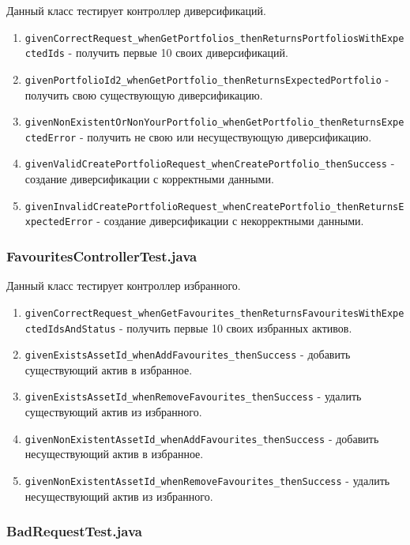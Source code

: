 \documentclass[a4paper, 14pt]{article}
\begin{document}
Данный класс тестирует контроллер диверсификаций.

\begin{enumerate}
    \item \texttt{givenCorrectRequest\_whenGetPortfolios\_thenReturnsPortfoliosWithExpectedIds} - получить первые 10 своих диверсификаций.
    \item \texttt{givenPortfolioId2\_whenGetPortfolio\_thenReturnsExpectedPortfolio} - получить свою существующую диверсификацию.
    \item \texttt{givenNonExistentOrNonYourPortfolio\_whenGetPortfolio\_thenReturnsExpectedError} - получить не свою или несуществующую диверсификацию.
    \item \texttt{givenValidCreatePortfolioRequest\_whenCreatePortfolio\_thenSuccess} - создание диверсификации с корректными данными.
    \item \texttt{givenInvalidCreatePortfolioRequest\_whenCreatePortfolio\_thenReturnsExpectedError} - создание диверсификации с некорректными данными.
\end{enumerate}

\subsubsection{FavouritesControllerTest.java}

Данный класс тестирует контроллер избранного.

\begin{enumerate}
    \item \texttt{givenCorrectRequest\_whenGetFavourites\_thenReturnsFavouritesWithExpectedIdsAndStatus} - получить первые 10 своих избранных активов.
    \item \texttt{givenExistsAssetId\_whenAddFavourites\_thenSuccess} - добавить существующий актив в избранное.
    \item \texttt{givenExistsAssetId\_whenRemoveFavourites\_thenSuccess} - удалить существующий актив из избранного.
    \item \texttt{givenNonExistentAssetId\_whenAddFavourites\_thenSuccess} - добавить несуществующий актив в избранное.
    \item \texttt{givenNonExistentAssetId\_whenRemoveFavourites\_thenSuccess} - удалить несуществующий актив из избранного.
\end{enumerate}

\subsubsection{BadRequestTest.java}
\end{document}
